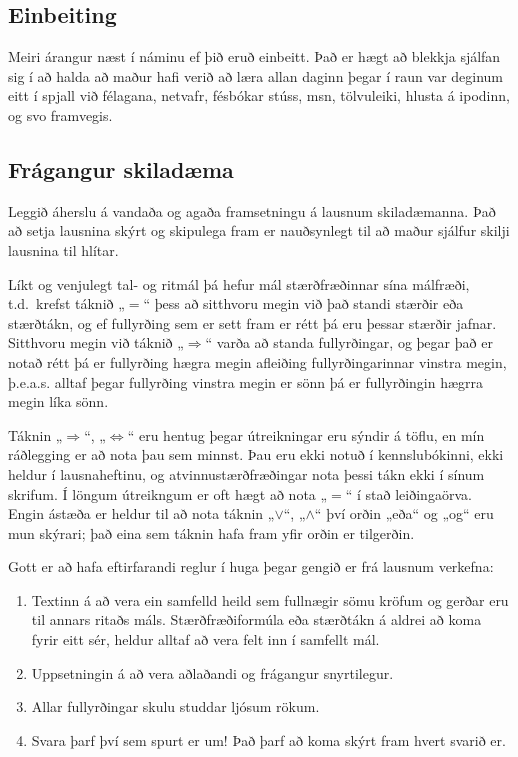\documentclass[b5paper,10pt,icelandic]{sphinxmanual}
\begin{document}
\subsection{Einbeiting}
\label{\detokenize{vidauki:einbeiting}}
Meiri árangur næst í náminu ef þið eruð einbeitt.
Það er hægt að blekkja sjálfan sig í að halda að maður hafi verið að
læra allan daginn þegar í raun var deginum eitt í spjall við félagana,
netvafr, fésbókar stúss, msn, tölvuleiki, hlusta á ipodinn, og
svo framvegis.


\subsection{Frágangur skiladæma}
\label{\detokenize{vidauki:id1}}
Leggið áherslu á vandaða og agaða framsetningu á lausnum
skiladæmanna.  Það að setja lausnina skýrt og skipulega fram er
nauðsynlegt til að maður sjálfur skilji lausnina til hlítar.

Líkt og venjulegt tal- og ritmál þá hefur mál stærðfræðinnar sína
málfræði, t.d. krefst táknið „\(=\)“ þess að sitthvoru megin við
það standi stærðir eða stærðtákn, og ef fullyrðing sem er sett fram er
rétt þá eru þessar stærðir jafnar. Sitthvoru megin við táknið
„\(\Rightarrow\)“ varða að standa fullyrðingar, og þegar það er
notað rétt þá er fullyrðing hægra megin afleiðing fullyrðingarinnar
vinstra megin, þ.e.a.s. alltaf þegar fullyrðing vinstra megin er sönn þá
er fullyrðingin hægrra megin líka sönn.

Táknin „\(\Rightarrow\)“, „\(\Leftrightarrow\)“ eru hentug
þegar útreikningar eru sýndir á töflu, en mín ráðlegging er að nota þau
sem minnst. Þau eru ekki notuð í kennslubókinni, ekki heldur í
lausnaheftinu, og atvinnustærðfræðingar nota þessi tákn ekki í sínum
skrifum. Í löngum útreikngum er oft hægt að nota „\(=\)“ í stað
leiðingaörva. Engin ástæða er heldur til að nota táknin
„\(\vee\)“, „\(\wedge\)“ því orðin „eða“ og „og“ eru mun
skýrari; það eina sem táknin hafa fram yfir orðin er tilgerðin.

Gott er að hafa eftirfarandi reglur í huga þegar gengið er frá lausnum
verkefna:
\begin{enumerate}
\item {} 
Textinn á að vera ein samfelld heild sem fullnægir sömu kröfum og
gerðar eru til annars ritaðs máls. Stærðfræðiformúla eða stærðtákn á
aldrei að koma fyrir eitt sér, heldur alltaf að vera felt inn í samfellt
mál.

\item {} 
Uppsetningin á að vera aðlaðandi og frágangur snyrtilegur.

\item {} 
Allar fullyrðingar skulu studdar ljósum rökum.

\item {} 
Svara þarf því sem spurt er um! Það þarf að koma skýrt fram hvert
svarið er.

\end{enumerate}
\end{document}
